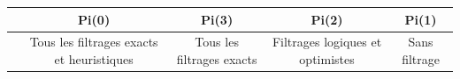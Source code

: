 \begin{table}[H]
	\centering
	\small
	\begin{tabular}{|r|rrr|rrr|rrr|rrr|}
		\toprule
		\hline
		\rowcolor{cyan}	&\multicolumn{3}{c|}{\textbf{Pi(0)}} & \multicolumn{3}{c|}{\textbf{Pi(3)}}&\multicolumn{3}{c|}{\textbf{Pi(2)}}&\multicolumn{3}{c|}{\textbf{Pi(1)}} \\ \hline
		\midrule
		
			\hline
		\rowcolor{cyan}	&\multicolumn{3}{c|}{ \tiny{Tous les filtrages exacts et heuristiques}} & \multicolumn{3}{c|}{\tiny{Tous les filtrages exacts}}&\multicolumn{3}{c|}{\tiny{Filtrages logiques et optimistes}}&\multicolumn{3}{c|}{\tiny{Sans filtrage}}
		\\ \hline
		\midrule
		

\end{tabular}
\end{table}
